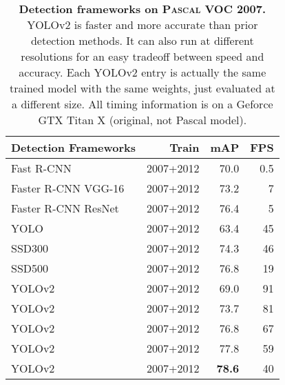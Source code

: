 \documentclass[10pt,twocolumn,letterpaper]{article}
\newcommand{\rxs}{69.0}
\newcommand{\rsmall}{73.7}
\newcommand{\rmed}{76.8}
\newcommand{\rlarge}{77.8}
\newcommand{\rxl}{78.6}
\newcommand{\sxs}{91}
\newcommand{\ssmall}{81}
\newcommand{\smed}{67}
\newcommand{\slarge}{59}
\newcommand{\sxl}{40}
\begin{document}
\begin{table}[h]
\begin{center}
\begin{tabular}{lrrr}
Detection Frameworks & Train & mAP & FPS\\
\hline
Fast R-CNN \cite{fastrcnn}& 2007+2012 & 70.0 & 0.5 \\
Faster R-CNN VGG-16\cite{ren2015faster}& 2007+2012 & 73.2 & 7 \\
Faster R-CNN ResNet\cite{resnet}& 2007+2012 & 76.4 & 5 \\
YOLO \cite{yolo} & 2007+2012 & 63.4 & 45 \\
SSD300 \cite{ssd} & 2007+2012 & 74.3 & 46 \\
SSD500 \cite{ssd} & 2007+2012 & 76.8 & 19 \\
\hline
YOLOv2  & 2007+2012 & \rxs & \sxs \\
YOLOv2  & 2007+2012 & \rsmall & \ssmall \\
YOLOv2  & 2007+2012 & \rmed & \smed \\
YOLOv2  & 2007+2012 & \rlarge & \slarge \\
YOLOv2  & 2007+2012 & \textbf{\rxl} & \sxl \\
\end{tabular}
\end{center}
\caption{\small \textbf{Detection frameworks on \textsc{Pascal} VOC 2007.} YOLOv2 is faster and more accurate than prior detection methods. It can also run at different resolutions for an easy tradeoff between speed and accuracy. Each YOLOv2 entry is actually the same trained model with the same weights, just evaluated at a different size. All timing information is on a Geforce GTX Titan X (original, not Pascal model).}
\label{timing}
\end{table}
\end{document}
